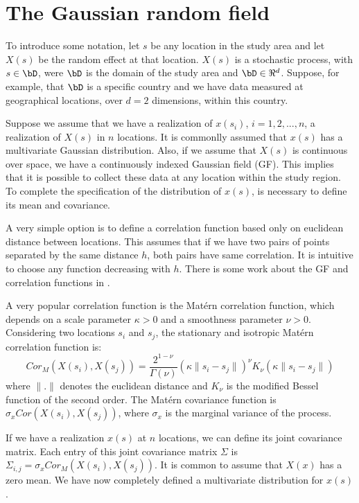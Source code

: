 \section{The Gaussian random field}

To introduce some notation, let $s$ be any 
location in the study area and let $X(s)$ be 
the random effect at that location. 
$X(s)$ is a stochastic process, with $s\in \bD$, 
were $\bD$ is the domain of the study area and $\bD\in \Re^d$. 
Suppose, for example, that $\bD$ is a specific country 
and we have data measured at geographical 
locations, over $d=2$ dimensions, within this country. 

Suppose we assume that we have a realization 
of $x(s_i)$, $i=1,2,...,n$, a realization of $X(s)$ 
in $n$ locations. It is commonlly assumed that 
$x(s)$ has a multivariate Gaussian distribution. 
Also, if we assume that $X(s)$ is continuous over space, 
we have a continuously indexed Gaussian field (GF). 
This implies that it is possible to collect these 
data at any location within the study region. 
To complete the specification of the distribution of 
$x(s)$, is necessary to define its mean and covariance. 

A very simple option is to define a 
correlation function based only on euclidean 
distance between locations. 
This assumes that if we have two pairs of 
points separated by the same distance $h$, both pairs 
have same correlation. 
It is intuitive to choose any function 
decreasing with $h$. 
There is some work about the GF and correlation 
functions in \cite{abrahamsen:1997}. 

A very popular correlation function is the 
Mat\'ern correlation function, which depends 
on a scale parameter $\kappa>0$ and a smoothness 
parameter $\nu>0$. 
Considering two locations $s_i$ and $s_j$, the 
stationary and isotropic Mat\'ern correlation function is: 
\begin{equation}
Cor_M(X(s_i), X(s_j)) = 
\frac{2^{1-\nu}}{\Gamma(\nu)}
(\kappa \parallel s_i - s_j\parallel)^\nu 
K_\nu(\kappa \parallel s_i - s_j \parallel)
\end{equation}
where $\parallel . \parallel$ denotes 
the euclidean distance and $K_\nu$ is the modified 
Bessel function of the second order. 
The Mat\'ern covariance function is
$\sigma_x Cor(X(s_i), X(s_j))$, where 
$\sigma_x$ is the marginal variance of the process. 

If we have a realization $x(s)$ at $n$ locations, 
we can define its joint covariance matrix. 
Each entry of this joint covariance matrix $\Sigma$ is 
$\Sigma_{i,j} = \sigma_xCor_M(X(s_i), X(s_j))$. 
It is common to assume that $X(x)$ has a zero mean. 
We have now completely defined a multivariate 
distribution for $x(s)$. 

